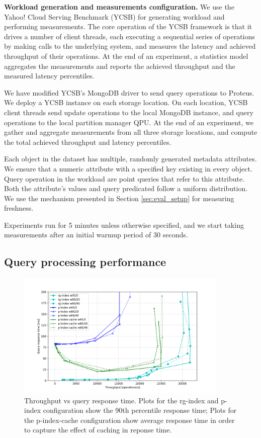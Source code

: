 \bigskip
\noindent
\textbf{Workload generation and measurements configuration.}
We use the Yahoo! Cloud Serving Benchmark (YCSB) \cite{ycsb} for generating workload and performing measurements.
The core operation of the YCSB framework is that it drives a number of client threads,
each executing a sequential series of operations by making calls to the underlying system,
and measures the latency and achieved throughput of their operations.
At the end of an experiment, a statistics model aggregates the measurements and reports the achieved throughput and
the measured latency percentiles.

We have modified YCSB's MongoDB driver to send query operations to Proteus.
We deploy a YCSB instance on each storage location.
On each location, YCSB client threads send update operations to the local MongoDB instance,
and query operations to the local partition manager QPU.
At the end of an experiment, we gather and aggregate measurements from all three storage locations,
and compute the total achieved throughput and latency percentiles.

Each object in the dataset has multiple, randomly generated metadata attributes.
We ensure that a numeric attribute with a specified key existing in every object.
Query operation in the workload are point queries that refer to this attribute.
Both the attribute's values and query predicated follow a uniform distribution.
We use the mechanism presented in Section \ref{sec:eval_setup} for measuring freshness.

Experiments run for 5 minutes unless otherwise specified, and we start taking measurements after an initial
warmup period of 30 seconds.

\subsection{Query processing performance}

\begin{figure}[H]
\centering
  \includegraphics[width=0.9\textwidth]{./figures/evaluation/ycsb_responseTime.png}
  \caption{Throughput vs query response time. Plots for the rg-index and p-index configuration show the 90th percentile response time;
  Plots for the p-index-cache configuration show average response time in order to capture the effect of caching in reponse time.}
  \label{fig:ycsb_responseTime}
\end{figure}

